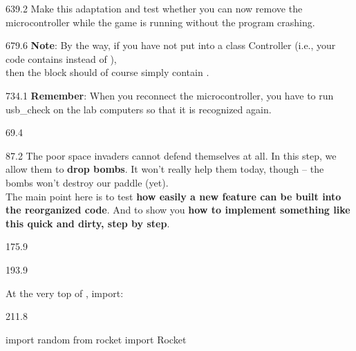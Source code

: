 \documentclass{aslab}
\begin{document}
\begin{region}[pitch=13.2]{639.2}
Make this adaptation and test whether you can now remove the microcontroller
while the game is running without the program crashing.
\end{region}

\begin{region}[pitch=13.55]{679.6}
\textbf{Note}: By the way, if you have not put  into a class
Controller (i.e., your code contains  instead of
),\\
then the  block should of course simply contain
.
\end{region}

\begin{region}[pitch=13.3]{734.1}
\textbf{Remember}: When you reconnect the microcontroller, you have to run
usb\_check on the lab computers so that it is recognized again.
\end{region}

\nextpage
\begin{region}{69.4}
\end{region}

\begin{region}[pitch=14]{87.2}
The poor space invaders cannot defend themselves at all. In this step, we
allow them to \textbf{drop bombs}. It won't really help them today, though
-- the bombs won't destroy our paddle (yet).\\
The main point here is to test \textbf{how easily a new feature can be built
into the reorganized code}. And to show you \textbf{how to implement
something like this quick and dirty, step by step}.
\end{region}

\begin{region}{175.9}
\end{region}

\begin{region}{193.9}
\begin{plaintasks}
\item At the very top of , import:
\end{plaintasks}
\end{region}

\begin{region}[x=74.7,right=0,pitch=13.2]{211.8}
\begin{codeblock}
import random
from rocket import Rocket
\end{codeblock}
\end{region}
\end{document}
